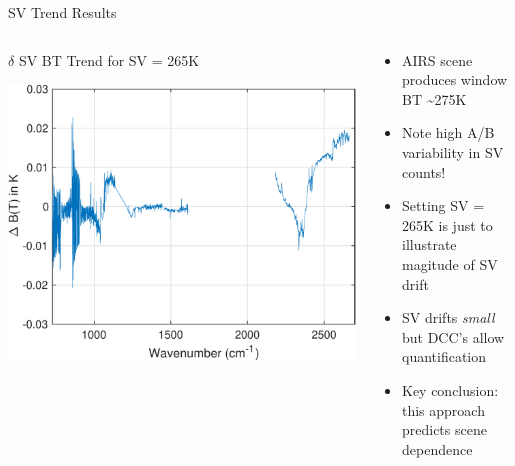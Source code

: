 \documentclass[10pt,t]{beamer}
\begin{document}
\begin{frame}[label={sec:org70b8f99}]{SV Trend Results}
\vspace{-0.25in}
\begin{columns}
\begin{column}{0.5\columnwidth}
\begin{block}{\scriptsize \(\delta\) SV BT Trend for SV = 265K}
\vspace{-0.12in}
\begin{center}
\includegraphics[width=0.8\linewidth]{./Figs/Pdf/dbt_sv_if_sbt_is_265k.pdf}
\end{center}
\end{block}
\end{column}

\begin{column}{0.55\columnwidth}
\begin{block}{}
\vspace{-0.15in}
\scriptsize
\begin{itemize}
\item AIRS scene produces window BT \textasciitilde{}275K
\item Note high A/B variability in SV counts!
\item Setting SV = 265K is just to illustrate magitude of SV drift
\item SV drifts \emph{small} but DCC's allow quantification
\item Key conclusion: this approach predicts scene dependence
\end{itemize}
\end{block}
\end{column}
\end{columns}
\end{frame}
\end{document}
